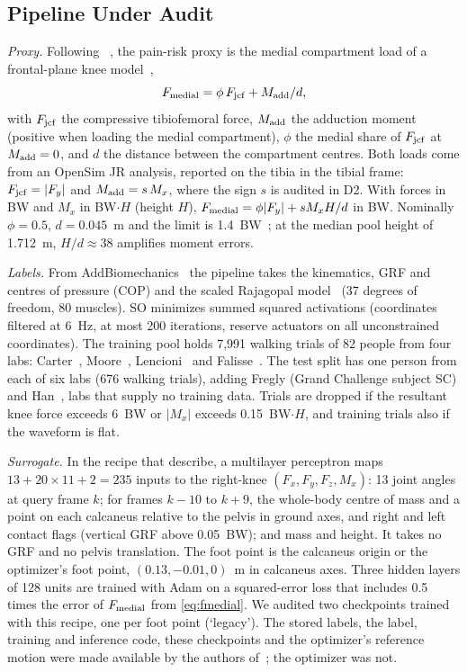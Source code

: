 \subsection{Pipeline Under Audit}\label{sec:pipeline}
\textit{Proxy.} Following \Chong{}~\citeChong{}, the pain-risk proxy is the
medial compartment load of a frontal-plane knee model~\cite{schipplein1991},
\begin{equation}\label{eq:fmedial}
  F_{\mathrm{medial}} = \phi\,F_{\mathrm{jcf}} + M_{\mathrm{add}}/d ,
\end{equation}
with $F_{\mathrm{jcf}}$ the compressive tibiofemoral force, $M_{\mathrm{add}}$ the adduction moment (positive when
loading the medial compartment), $\phi$ the medial share of $F_{\mathrm{jcf}}$ at $M_{\mathrm{add}} = 0$, and $d$
the distance between the compartment centres. Both loads come from an OpenSim JR analysis,
reported on the tibia in the tibial frame: $F_{\mathrm{jcf}} = |F_y|$ and $M_{\mathrm{add}} = s\,M_x$,
where the sign $s$ is audited in D2. With forces in BW and $M_x$ in BW$\cdot H$ (height $H$),
$F_{\mathrm{medial}} = \phi|F_y| + s M_x H/d$ in BW. Nominally $\phi = 0.5$,
$d = 0.045$~m and the limit is 1.4~BW~\citeChong{}; at the median pool height of
1.712~m, $H/d \approx 38$ amplifies moment errors.

\textit{Labels.} From AddBiomechanics~\cite{werling2024} the pipeline takes the kinematics, GRF
and centres of pressure (COP) and the scaled Rajagopal model~\cite{rajagopal2016} (37 degrees of
freedom, 80 muscles). SO minimizes summed squared activations (coordinates filtered at 6~Hz, at
most 200 iterations, reserve actuators on all unconstrained coordinates). The training pool holds
7,991 walking trials of 82 people from four labs: Carter~\cite{carter2024}, Moore~\cite{moore2015}, Lencioni~\cite{lencioni2019} and
Falisse~\cite{falisse2017}. The test split has one person from each of six labs (676 walking
trials), adding Fregly (Grand Challenge subject SC) and Han~\cite{han2023}, labs that supply no
training data. Trials are dropped if the resultant knee force exceeds 6~BW or $|M_x|$ exceeds
0.15~BW$\cdot H$, and training trials also if the waveform is flat.

\textit{Surrogate.} In the recipe that \Chong{} describe, a multilayer perceptron maps
$13 + 20\times11 + 2 = 235$ inputs to the
right-knee $(F_x, F_y, F_z, M_x)$: 13 joint angles at query frame $k$; for frames $k-10$ to
$k+9$, the whole-body centre of mass and a point on each calcaneus relative to the pelvis in
ground axes, and right and left contact flags (vertical GRF above 0.05~BW); and mass and height.
It takes no GRF and no pelvis translation. The foot point is the calcaneus origin or the
optimizer's foot point, $(0.13,-0.01,0)$~m in calcaneus axes. Three hidden layers of 128 units
are trained with Adam on a squared-error loss that includes 0.5 times the error of $F_{\mathrm{medial}}$ from
\eqref{eq:fmedial}. We audited two checkpoints trained with this recipe, one per foot point (`legacy').
The stored labels, the label, training and inference code, these checkpoints and the optimizer's
reference motion were made available by the authors of~\citeChong{}; the optimizer was not.

